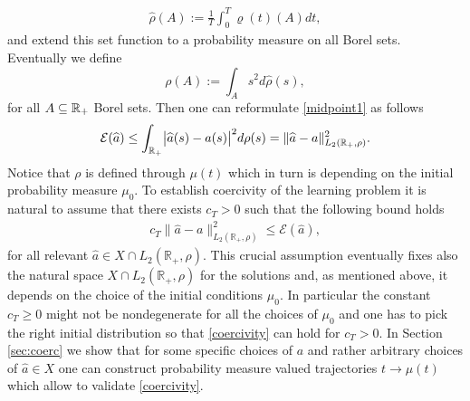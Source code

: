 \begin{align}\label{eq-rho-4}
	\widehat \rho(A):=\frac{1}{T}\int_0^T\varrho(t)(A)dt,
\end{align}
and extend this set function to a probability measure on all Borel sets. Eventually we define
$$
 \rho(A):=\int_A s^2 d\widehat \rho(s),
$$
for all  $A\subseteq\mathbb{R}_+$ Borel sets.
Then one can reformulate \eqref{midpoint1} as follows
\begin{align}\label{midpoint2}
	\mathcal E(\widehat a)\leq \int_{\mathbb{R}_+}\bigl|\widehat a(s)-a(s)\bigr|^2 d \rho(s)
		=\| \widehat a - a \|^2_{L_2(\mathbb R_+,\rho)}.
\end{align}
Notice that $\rho$ is defined through $\mu(t)$ which in turn is depending on the initial probability measure $\mu_0$. To establish coercivity of the learning problem
it is natural to assume that there exists  $c_T>0$ such that the following bound holds
\begin{align}\label{coercivity}
	c_T \| \widehat a - a \|^2_{L_2(\mathbb R_+,\rho)} \leq \mathcal E(\widehat a),
\end{align}
for all relevant $\widehat a \in X \cap  L_2(\mathbb R_+,\rho)$. This crucial assumption eventually fixes also the natural space $X \cap  L_2(\mathbb R_+,\rho)$ for the solutions 
and, as mentioned above, it depends on the choice of the initial conditions $\mu_0$. In particular the constant $c_T\geq 0$ might not be nondegenerate for all the choices of $\mu_0$
and one has to pick the right initial distribution so that \eqref{coercivity} can hold for $c_T >0$. 
In Section \ref{sec:coerc} we show that for some specific choices of $a$ and rather arbitrary choices of $\widehat a \in X$ one can construct probability measure valued trajectories $t \to \mu(t)$ which allow to validate
\eqref{coercivity}.


